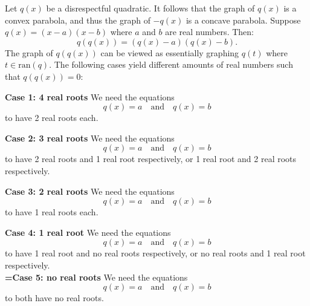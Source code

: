 \begin{enumerate}
Let $q(x)$ be a disrespectful quadratic. It follows that the graph of $q(x)$ is a convex parabola, and thus the graph of $-q(x)$ is a concave parabola. Suppose $q(x)=(x-a)(x-b)$ where $a$ and $b$ are real numbers. Then:
 \[q(q(x))=(q(x)-a)(q(x)-b).\]The graph of $q(q(x))$ can be viewed as essentially graphing $q(t)$ where $t\in \mathrm{ran}(q).$ The following cases yield different amounts of real numbers such that $q(q(x))=0:$

 \textbf{Case 1: 4 real roots} We need the equations
 \[q(x)=a\quad\text{and}\quad q(x)=b\]to have 2 real roots each.

 \textbf{Case 2: 3 real roots} We need the equations 
 \[q(x)=a\quad\text{and}\quad q(x)=b\]to have 2 real roots and 1 real root respectively, or 1 real root and 2 real roots respectively.

 \textbf{Case 3: 2 real roots} We need the equations
 \[q(x)=a\quad\text{and}\quad q(x)=b\]to have 1 real roots each.

 \textbf{Case 4: 1 real root} We need the equations
 \[q(x)=a\quad\text{and}\quad q(x)=b\]to have 1 real root and no real roots respectively, or no real roots and 1 real root respectively.\\

 \textbf{=Case 5: no real roots} We need the equations
 \[q(x)=a\quad\text{and}\quad q(x)=b\]to both have no real roots.


\end{enumerate}
